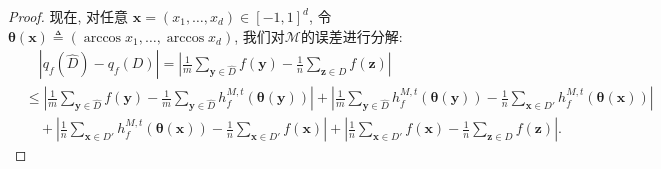 \begin{proof}
现在, 对任意 $\mathbf{x} = (x_1,\ldots,x_d) \in [-1,1]^d$, 令$\boldsymbol {\theta}(\mathbf{x})\triangleq (\arccos x_1,\ldots, \arccos x_d)$, 我们对$\mathcal{M}$的误差进行分解:
\begin{align}\label{eq:误差分解1}
		& \quad \left|q_f(\hat{D}) - q_f(D) \right|
		= \left|\frac{1}{m}\sum_{\mathbf{y}\in \hat{D}}f(\mathbf{y})-
		    \frac{1}{n}\sum_{\mathbf{z}\in D}f(\mathbf{z}) \right| \nonumber \\
		& \le \left|\frac{1}{m}\sum_{\mathbf{y}\in \hat{D}}f(\mathbf{y}) -  \frac{1}{m}\sum_{\mathbf{y}\in \hat{D}} h_f^{M,t}\left( \boldsymbol{\theta}(\mathbf{y}) \right) \right|  + \left|\frac{1}{m}\sum_{\mathbf{y}\in \hat{D}} h_f^{M,t}\left( \boldsymbol{\theta}(\mathbf{y}) \right) -  \frac{1}{n}\sum_{\mathbf{x}\in D'} h_f^{M,t}\left( \boldsymbol{\theta}(\mathbf{x}) \right) \right|  \nonumber\\
		&\quad+ \left|\frac{1}{n}\sum_{\mathbf{x}\in D'} h_f^{M,t}\left( \boldsymbol{\theta}(\mathbf{x}) \right) - \frac{1}{n}\sum_{\mathbf{x}\in D'} f(\mathbf{x})  \right| + \left|\frac{1}{n}\sum_{\mathbf{x}\in D'} f(\mathbf{x}) - \frac{1}{n}\sum_{\mathbf{z}\in D} f(\mathbf{z}) \right|.
\end{align}


\end{proof}
